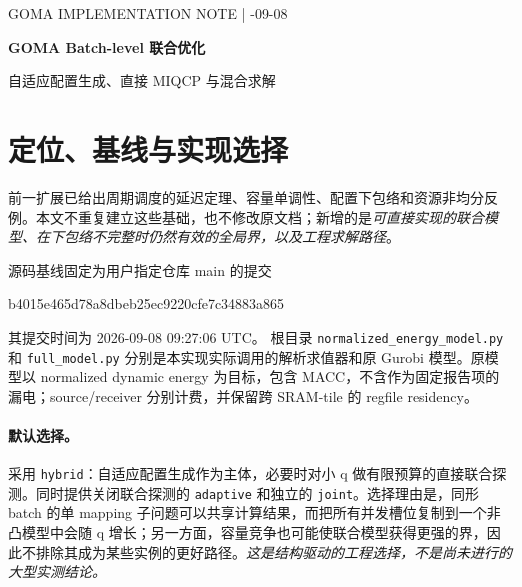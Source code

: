 \documentclass[UTF8,11pt,a4paper,fontset=fandol]{ctexart}
\theoremstyle{remark}\newtheorem{remark}[proposition]{说明}
\numberwithin{equation}{section}
\begin{document}
\begin{center}
{\small\sffamily\color{muted} GOMA IMPLEMENTATION NOTE \quad | -09-08}\par\vspace{8pt}
{\LARGE\bfseries\color{ink} GOMA Batch-level 联合优化}\par\vspace{5pt}
{\large 自适应配置生成、直接 MIQCP 与混合求解}\par\vspace{9pt}
\end{center}
\begin{abstract}
本文是 \texttt{GOMA\_batch\_extension\_zh} 的独立建模与实现补充。保留每个 batch 的原三维 GEMM mapping，直接集成指定 main 版本的解析模型与 Gurobi 模型。面向实际求解，提供两条完整路径：一是同时优化并发槽位资源和 mapping 的直接联合 MIQCP，通过最小 PE 数的离散选择把 EDP 写成线性条件目标，不新增能量--延迟双线性耦合；二是使用真实 mapping 形成上界目录、使用覆盖全部容量域的区间松弛形成下界目录，再由配置重数 MILP 联合选择并行度和资源分区，按需调用原 GOMA。默认混合方案把少量联合求解得到的可行配置和有效下界反馈给自适应主问题。实现包含模型复用、缓存、整数与能量重算、超时界管理及复现实验接口。已执行验证覆盖 48,444 个 mapping 的当前解析模型核对、外层分配对照及边界测试；Gurobi 后端和大型端到端性能比较尚未在本次环境中执行。
\end{abstract}

\section{定位、基线与实现选择}
\label{sec:decision}
前一扩展\cite{batch}已给出周期调度的延迟定理、容量单调性、配置下包络和资源非均分反例。本文不重复建立这些基础，也不修改原文档；新增的是\emph{可直接实现的联合模型、在下包络不完整时仍然有效的全局界，以及工程求解路径}。

源码基线固定为用户指定仓库 main 的提交
\begin{center}\small\ttfamily b4015e465d78a8dbeb25ec9220cfe7c34883a865\end{center}
其提交时间为 2026-09-08 09:27:06 UTC。
根目录 {\small\texttt{normalized\_energy\_model.py}} 和 {\small\texttt{full\_model.py}} 分别是本实现实际调用的解析求值器和原 Gurobi 模型\cite{commit,energy,full}。原模型以 normalized dynamic energy 为目标，包含 MACC，不含作为固定报告项的漏电；source/receiver 分别计费，并保留跨 SRAM-tile 的 regfile residency\cite{full,energy}。

\paragraph{默认选择。}
采用 \texttt{hybrid}：自适应配置生成作为主体，必要时对小 q 做有限预算的直接联合探测。同时提供关闭联合探测的 \texttt{adaptive} 和独立的 \texttt{joint}。选择理由是，同形 batch 的单 mapping 子问题可以共享计算结果，而把所有并发槽位复制到一个非凸模型中会随 q 增长；另一方面，容量竞争也可能使联合模型获得更强的界，因此不排除其成为某些实例的更好路径。\emph{这是结构驱动的工程选择，不是尚未进行的大型实测结论。}
\end{document}
